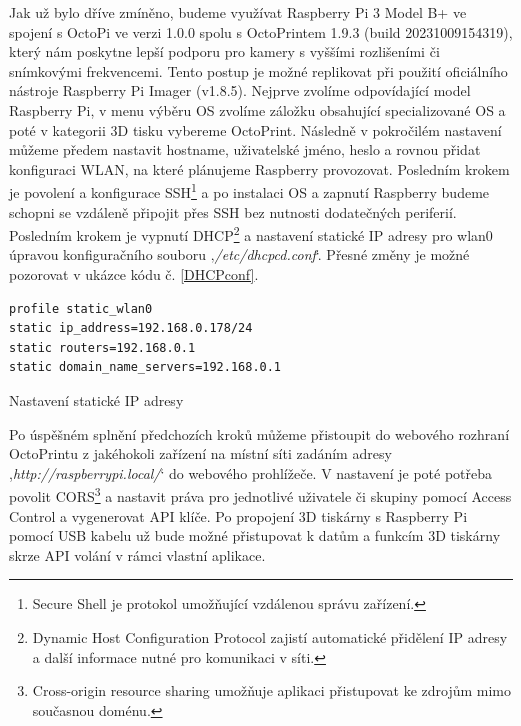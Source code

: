 \documentclass[twoside, 12pt]{article}
\begin{document}
Jak už bylo dříve zmíněno, budeme využívat Raspberry Pi 3 Model B+ ve spojení s OctoPi ve verzi 1.0.0 spolu s OctoPrintem 1.9.3 (build 20231009154319), který nám poskytne lepší podporu pro kamery s vyššími rozlišeními či snímkovými frekvencemi. Tento postup je možné replikovat při použití oficiálního nástroje Raspberry Pi Imager (v1.8.5). Nejprve zvolíme odpovídající model Raspberry Pi, v menu výběru OS zvolíme záložku obsahující specializované OS a poté v kategorii 3D tisku vybereme OctoPrint. Následně v pokročilém nastavení můžeme předem nastavit hostname, uživatelské jméno, heslo a rovnou přidat konfiguraci WLAN, na které plánujeme Raspberry provozovat. Posledním krokem je povolení a konfigurace SSH\footnote{Secure Shell je protokol umožňující vzdálenou správu zařízení.} a po instalaci OS a zapnutí Raspberry budeme schopni se vzdáleně připojit přes SSH bez nutnosti dodatečných periferií. Posledním krokem je vypnutí DHCP\footnote{Dynamic Host Configuration Protocol zajistí automatické přidělení IP adresy a další informace nutné pro komunikaci v síti.} a nastavení statické IP adresy pro wlan0 úpravou konfiguračního souboru ‚\textit{/etc/dhcpcd.conf}‘. Přesné změny je možné pozorovat v ukázce kódu č. \ref{DHCPconf}.
\\

\begin{listing}
\begin{verbatim}
profile static_wlan0
static ip_address=192.168.0.178/24
static routers=192.168.0.1
static domain_name_servers=192.168.0.1
\end{verbatim}
\caption{Nastavení statické IP adresy}
\label{DHCPconf}
\end{listing}






Po úspěšném splnění předchozích kroků můžeme přistoupit do webového rozhraní OctoPrintu z jakéhokoli zařízení na místní síti zadáním adresy ,\textit{http://raspberrypi.local/}‘ do webového prohlížeče. V nastavení je poté potřeba povolit CORS\footnote{Cross-origin resource sharing umožňuje aplikaci přistupovat ke zdrojům mimo současnou doménu.} a nastavit práva pro jednotlivé uživatele či skupiny pomocí Access Control a vygenerovat API klíče. Po propojení 3D tiskárny s Raspberry Pi pomocí USB kabelu už bude možné přistupovat k datům a funkcím 3D tiskárny skrze API volání v rámci vlastní aplikace.
    

\end{document}

